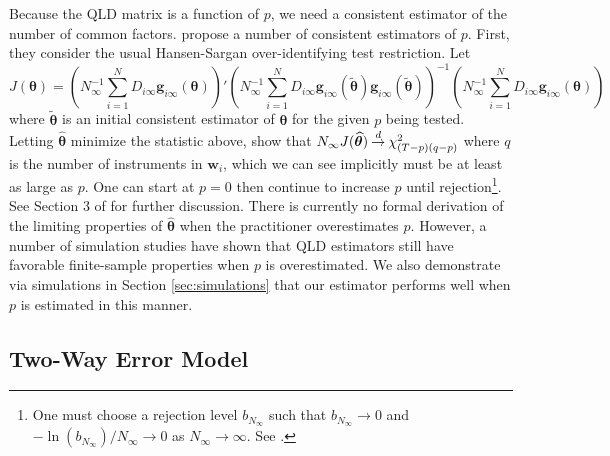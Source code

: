 \documentclass[12pt]{article}
\newcommand{\nick}[1]{\coauthorComment[Nick]{#1}}
\newcommand{\kyle}[1]{\coauthorComment[Kyle]{#1}}
\begin{document}
Because the QLD matrix is a function of $p$, we need a consistent estimator of the number of common factors. \citet{Ahn_Lee_Schmidt_2013} propose a number of consistent estimators of $p$. First, they consider the usual Hansen-Sargan over-identifying test restriction. Let
\begin{equation}
    J(\bm \theta) = \left( N_{\infty}^{-1} \sum_{i = 1}^N D_{i\infty} \bm g_{i\infty}(\bm \theta) \right)' \left( N_{\infty}^{-1} \sum_{i = 1}^N D_{i\infty} \bm g_{i\infty}(\tilde{\bm \theta}) \bm g_{i\infty}(\tilde{\bm \theta}) \right)^{-1} \left( N^{-1}_{\infty} \sum_{i = 1}^N D_{i\infty} \bm g_{i\infty}(\bm \theta) \right)
\end{equation}
where $\tilde{\bm \theta}$ is an initial consistent estimator of $\bm \theta$ for the given $p$ being tested. Letting $\widehat{\bm \theta}$ minimize the statistic above, \citet{Ahn_Lee_Schmidt_2013} show that $N_{\infty} J(\widehat{\bm \theta}) \mathbin{\overset{d}{\to}} \chi^2_{(T-p)(q-p)}$ 
where $q$ is the number of instruments in $\bm w_i$, which we can see implicitly must be at least as large as $p$. One can start at $p = 0$ then continue to increase $p$ until rejection\footnote{One must choose a rejection level $b_{N_{\infty}}$ such that $b_{N_\infty} \rightarrow 0$ and $-\ln(b_{N_{\infty}}) / N_\infty \rightarrow 0$ as $N_{\infty} \rightarrow \infty$. See \citet{Cragg_Donald_1997inferring}.}. See Section 3 of \citet{Ahn_Lee_Schmidt_2013} for further discussion. There is currently no formal derivation of the limiting properties of $\widehat{\bm \theta}$ when the practitioner overestimates $p$. However, a number of simulation studies \citep{Ahn_Lee_Schmidt_2013,Breitung_Hansen_2021,Brown_2022} have shown that QLD estimators still have favorable finite-sample properties when $p$ is overestimated. We also demonstrate via simulations in Section \ref{sec:simulations} that our estimator performs well when $p$ is estimated in this manner. 




\subsection{Two-Way Error Model}
\end{document}
